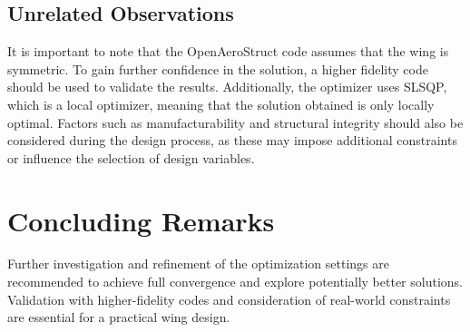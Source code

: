 \documentclass{article}
\begin{document}
\subsection{Unrelated Observations}
It is important to note that the OpenAeroStruct code assumes that the wing is symmetric. To gain further confidence in the solution, a higher fidelity code should be used to validate the results. Additionally, the optimizer uses SLSQP, which is a local optimizer, meaning that the solution obtained is only locally optimal. Factors such as manufacturability and structural integrity should also be considered during the design process, as these may impose additional constraints or influence the selection of design variables.

\section{Concluding Remarks}
Further investigation and refinement of the optimization settings are recommended to achieve full convergence and explore potentially better solutions. Validation with higher-fidelity codes and consideration of real-world constraints are essential for a practical wing design.
\end{document}
